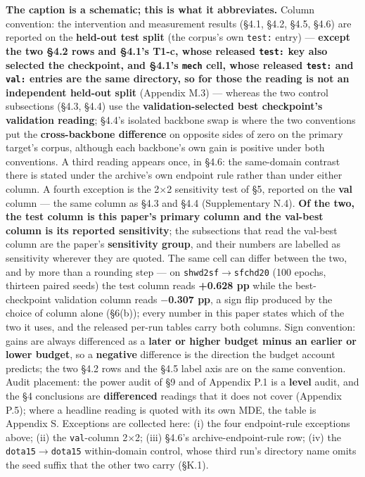 \documentclass[pdflatex,sn-mathphys-ay]{sn-jnl}
\begin{document}
\textbf{The caption is a schematic; this is what it abbreviates.} Column convention: the intervention and measurement results (\S{}4.1, \S{}4.2, \S{}4.5, \S{}4.6) are reported on the \textbf{held-out test split} (the corpus's own \texttt{test:} entry) --- \textbf{except the two \S{}4.2 rows and \S{}4.1's T1-c, whose released \texttt{test:} key also selected the checkpoint, and \S{}4.1's \texttt{mech} cell, whose released \texttt{test:} and \texttt{val:} entries are the same directory, so for those the reading is not an independent held-out split} (Appendix M.3) --- whereas the two control subsections (\S{}4.3, \S{}4.4) use the \textbf{validation-selected best checkpoint's validation reading}; \S{}4.4's isolated backbone swap is where the two conventions put the \textbf{cross-backbone difference} on opposite sides of zero on the primary target's corpus, although each backbone's own gain is positive under both conventions. A third reading appears once, in \S{}4.6: the same-domain contrast there is stated under the archive's own endpoint rule rather than under either column. A fourth exception is the 2\ensuremath{\times}2 sensitivity test of \S{}5, reported on the \textbf{val} column --- the same column as \S{}4.3 and \S{}4.4 (Supplementary N.4). \textbf{Of the two, the test column is this paper's primary column and the val-best column is its reported sensitivity}; the subsections that read the val-best column are the paper's \textbf{sensitivity group}, and their numbers are labelled as sensitivity wherever they are quoted. The same cell can differ between the two, and by more than a rounding step --- on \texttt{shwd2sf\ensuremath{\rightarrow}sfchd20} (100 epochs, thirteen paired seeds) the test column reads \textbf{+0.628 pp} while the best-checkpoint validation column reads \textbf{\ensuremath{-}0.307 pp}, a sign flip produced by the choice of column alone (\S{}6(b)); every number in this paper states which of the two it uses, and the released per-run tables carry both columns. Sign convention: gains are always differenced as a \textbf{later or higher budget minus an earlier or lower budget}, so a \textbf{negative} difference is the direction the budget account predicts; the two \S{}4.2 rows and the \S{}4.5 label axis are on the same convention. Audit placement: the power audit of \S{}9 and of Appendix P.1 is a \textbf{level} audit, and the \S{}4 conclusions are \textbf{differenced} readings that it does not cover (Appendix P.5); where a headline reading is quoted with its own MDE, the table is Appendix S. Exceptions are collected here: (i) the four endpoint-rule exceptions above; (ii) the \texttt{val}-column 2\ensuremath{\times}2; (iii) \S{}4.6's archive-endpoint-rule row; (iv) the \texttt{dota15\ensuremath{\rightarrow}dota15} within-domain control, whose third run's directory name omits the seed suffix that the other two carry (\S{}K.1).
\end{document}
